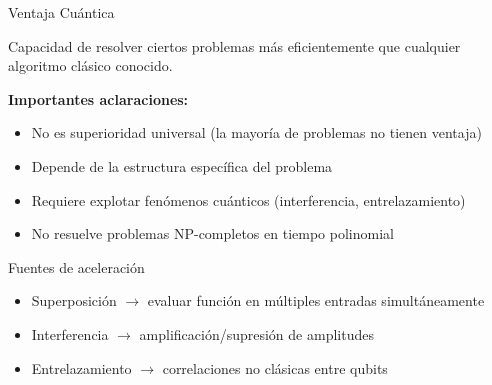 \documentclass[aspectratio=169]{beamer}
\begin{document}
\begin{frame}{Ventaja Cuántica}
\begin{definition}
Capacidad de resolver ciertos problemas más eficientemente que cualquier algoritmo clásico conocido.
\end{definition}

\vspace{0.2cm}
\textbf{Importantes aclaraciones:}
\begin{itemize}
\item No es superioridad universal (la mayoría de problemas no tienen ventaja)
\item Depende de la estructura específica del problema
\item Requiere explotar fenómenos cuánticos (interferencia, entrelazamiento)
\item No resuelve problemas NP-completos en tiempo polinomial
\end{itemize}

\vspace{0.2cm}
\begin{block}{Fuentes de aceleración}
\begin{itemize}
\item Superposición $\rightarrow$ evaluar función en múltiples entradas simultáneamente
\item Interferencia $\rightarrow$ amplificación/supresión de amplitudes
\item Entrelazamiento $\rightarrow$ correlaciones no clásicas entre qubits
\end{itemize}
\end{block}
\end{frame}
\end{document}
